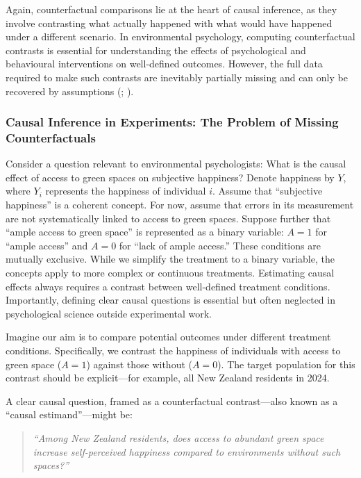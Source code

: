 \documentclass[
  singlecolumn]{article}
\begin{document}
Again, counterfactual comparisons lie at the heart of causal inference,
as they involve contrasting what actually happened with what would have
happened under a different scenario. In environmental psychology,
computing counterfactual contrasts is essential for understanding the
effects of psychological and behavioural interventions on well-defined
outcomes. However, the full data required to make such contrasts are
inevitably partially missing and can only be recovered by assumptions
(;
).

\subsubsection{Causal Inference in Experiments: The Problem of Missing
Counterfactuals}\label{causal-inference-in-experiments-the-problem-of-missing-counterfactuals}

Consider a question relevant to environmental psychologists: What is the
causal effect of access to green spaces on subjective happiness? Denote
happiness by \(Y\), where \(Y_i\) represents the happiness of individual
\(i\). Assume that ``subjective happiness'' is a coherent concept. For
now, assume that errors in its measurement are not systematically linked
to access to green spaces. Suppose further that ``ample access to green
space'' is represented as a binary variable: \(A = 1\) for ``ample
access'' and \(A = 0\) for ``lack of ample access.'' These conditions
are mutually exclusive. While we simplify the treatment to a binary
variable, the concepts apply to more complex or continuous treatments.
Estimating causal effects always requires a contrast between
well-defined treatment conditions. Importantly, defining clear causal
questions is essential but often neglected in psychological science
outside experimental work.

Imagine our aim is to compare potential outcomes under different
treatment conditions. Specifically, we contrast the happiness of
individuals with access to green space (\(A = 1\)) against those without
(\(A = 0\)). The target population for this contrast should be
explicit---for example, all New Zealand residents in 2024.

A clear causal question, framed as a counterfactual contrast---also
known as a ``causal estimand''---might be:

\begin{quote}
\emph{``Among New Zealand residents, does access to abundant green space
increase self-perceived happiness compared to environments without such
spaces?''}
\end{quote}
\end{document}
